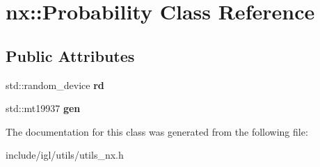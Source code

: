 \hypertarget{classnx_1_1Probability}{}\section{nx\+:\+:Probability Class Reference}
\label{classnx_1_1Probability}
\subsection*{Public Attributes}
\begin{DoxyCompactItemize}
\item 
\mbox{\label{classnx_1_1Probability_ac704afa0dd1d450e66180d4158bad943}} 
std\+::random\+\_\+device {\bfseries rd}
\item 
\mbox{\label{classnx_1_1Probability_a7660afa10adc251c8e4d6e28c600dfad}} 
std\+::mt19937 {\bfseries gen}
\end{DoxyCompactItemize}


The documentation for this class was generated from the following file\+:\begin{DoxyCompactItemize}
\item 
include/igl/utils/utils\+\_\+nx.\+h\end{DoxyCompactItemize}
